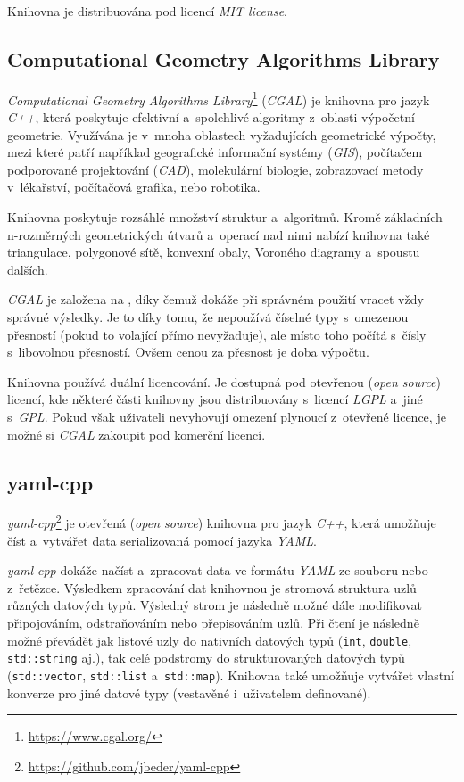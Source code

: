 Knihovna je distribuována pod licencí \emph{MIT license}.

\subsection*{Computational Geometry Algorithms Library}

\emph{Computational Geometry Algorithms Library}\footnote{\url{https://www.cgal.org/}} (\emph{CGAL}) je knihovna pro jazyk \emph{C++}, která poskytuje efektivní a~spolehlivé algoritmy z~oblasti výpočetní geometrie. Využívána je v~mnoha oblastech vyžadujících geometrické výpočty, mezi které patří například geografické informační systémy (\emph{GIS}), počítačem podporované projektování (\emph{CAD}), molekulární biologie, zobrazovací metody v~lékařství, počítačová grafika, nebo robotika.

Knihovna poskytuje rozsáhlé množství struktur a~algoritmů. Kromě základních n-roz\-měr\-ných geometrických útvarů a~operací nad nimi nabízí knihovna také triangulace, polygonové sítě, konvexní obaly, Voroného diagramy a~spoustu dalších.

\emph{CGAL} je založena na , díky čemuž dokáže při správném použití vracet vždy správné výsledky. Je to díky tomu, že nepoužívá číselné typy s~omezenou přesností (pokud to volající přímo nevyžaduje), ale místo toho počítá s~čísly s~libovolnou přesností. Ovšem cenou za přesnost je doba výpočtu.

Knihovna používá duální licencování. Je dostupná pod otevřenou (\emph{open source}) licencí, kde některé části knihovny jsou distribuovány s~licencí \emph{LGPL} a~jiné s~\emph{GPL}. Pokud však uživateli nevyhovují omezení plynoucí z~otevřené licence, je možné si \emph{CGAL} zakoupit pod komerční licencí.

\subsection*{yaml-cpp}

\emph{yaml-cpp}\footnote{\url{https://github.com/jbeder/yaml-cpp}} je otevřená (\emph{open source}) knihovna pro jazyk \emph{C++}, která umožňuje číst a~vytvářet data serializovaná pomocí jazyka \emph{YAML}.

\emph{yaml-cpp} dokáže načíst a~zpracovat data ve formátu \emph{YAML} ze souboru nebo z~řetězce. Výsledkem zpracování dat knihovnou je stromová struktura uzlů různých datových typů. Výsledný strom je následně možné dále modifikovat připojováním, odstraňováním nebo přepisováním uzlů. Při čtení je následně možné převádět jak listové uzly do nativních datových typů (\texttt{int}, \texttt{double}, \texttt{std::string} aj.), tak celé podstromy do strukturovaných datových typů (\texttt{std::vector}, \texttt{std::list} a~\texttt{std::map}). Knihovna také umožňuje vytvářet vlastní konverze pro jiné datové typy (vestavěné i~uživatelem definované).

